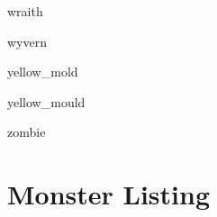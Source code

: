 \documentclass[letterpaper,serif]{module}
\begin{document}
\begin{newmonster}{wraith}\end{newmonster}

\begin{newmonster}{wyvern}\end{newmonster}

\begin{newmonster}{yellow_mold}\end{newmonster}

\begin{newmonster}{yellow_mould}\end{newmonster}

\begin{newmonster}{zombie}\end{newmonster}

\onecolumn

\section*{Monster Listing}
\label{wanderingmonsters}
\end{document}
